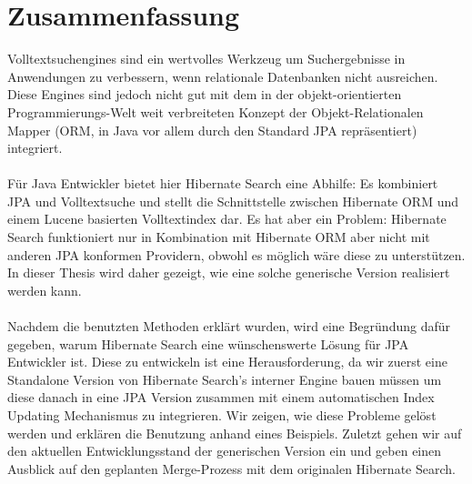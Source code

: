 \section*{Zusammenfassung}
Volltextsuchengines sind ein wertvolles Werkzeug um Suchergebnisse in Anwendungen zu verbessern, wenn relationale Datenbanken nicht ausreichen. Diese Engines sind jedoch nicht gut mit dem in der objekt-orientierten Programmierungs-Welt weit verbreiteten Konzept der Objekt-Relationalen Mapper (ORM, in Java vor allem durch den Standard JPA repräsentiert) integriert. 
\\\\
Für Java Entwickler bietet hier Hibernate Search eine Abhilfe: Es kombiniert JPA und Volltextsuche und stellt die Schnittstelle zwischen Hibernate ORM und einem Lucene basierten Volltextindex dar. Es hat aber ein Problem: Hibernate Search funktioniert nur in Kombination mit Hibernate ORM aber nicht mit anderen JPA konformen Providern, obwohl es möglich wäre diese zu unterstützen. In dieser Thesis wird daher gezeigt, wie eine solche generische Version realisiert werden kann.
\\\\
Nachdem die benutzten Methoden erklärt wurden, wird eine Begründung dafür gegeben, warum Hibernate Search eine wünschenswerte Lösung für JPA Entwickler ist. Diese zu entwickeln ist eine Herausforderung, da wir zuerst eine Standalone Version von Hibernate Search's interner Engine bauen müssen um diese danach in eine JPA Version zusammen mit einem automatischen Index Updating Mechanismus zu integrieren. Wir zeigen, wie diese Probleme gelöst werden und erklären die Benutzung anhand eines Beispiels. Zuletzt gehen wir auf den aktuellen Entwicklungsstand der generischen Version ein und geben einen Ausblick auf den geplanten Merge-Prozess mit dem originalen Hibernate Search.

